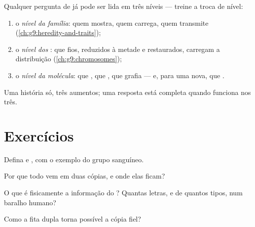 \begin{method}\label{met:g9:genes-and-dna:levels}
Qualquer pergunta de  já pode ser lida em três
níveis --- treine a troca de nível:
\begin{enumerate}
  \item o \emph{nível da família}: quem mostra, quem
        carrega, quem transmite
        (\cref{ch:g9:heredity-and-traits});
  \item o \emph{nível dos }: que fios, reduzidos à
        metade e restaurados, carregam a distribuição
        (\cref{ch:g9:chromosomes});
  \item o \emph{nível da molécula}: que , que , que
        grafia --- e, para uma  nova, que
        .
\end{enumerate}
Uma história só, três aumentos; uma resposta está completa
quando funciona nos três.
\end{method}

\section{Exercícios}

\begin{exercise}[$\star$]\label{exo:g9:genes-and-dna:1}
Defina  e , com o exemplo do grupo sanguíneo.
\end{exercise}

\begin{exercise}[$\star$]\label{exo:g9:genes-and-dna:2}
Por que todo  vem em duas cópias, e onde elas ficam?
\end{exercise}

\begin{exercise}[$\star$]\label{exo:g9:genes-and-dna:3}
O que é fisicamente a informação do ? Quantas letras, e de
quantos tipos, num baralho humano?
\end{exercise}

\begin{exercise}[$\star$]\label{exo:g9:genes-and-dna:4}
Como a fita dupla torna possível a cópia fiel?
\end{exercise}

